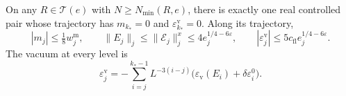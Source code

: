 \begin{theorem}\label{thm:rgfl-terminal-zero-pair}
On any $R\in\mathcal T(e)$ with $N\ge N_{\min}(R,e)$,
there is exactly one real controlled pair whose
trajectory has $m_{k_*}=0$ and
$\varepsilon_{k_*}^{\mathrm v}=0$.
Along its trajectory,
\begin{equation}\label{eq:rgfl-tuned-bounds}
 |m_j|\le\tfrac18w_j^{\mathrm m},\qquad
 \|E_j\|_j\le\|\mathscr E_j\|_j^x
                                  \le4e_j^{1/4-6\varepsilon},\qquad
 |\varepsilon_j^{\mathrm v}|
                          \le5c_{\mathrm{fl}}e_j^{1/4-6\varepsilon}.
\end{equation}
The vacuum at every level is
\begin{equation}\label{eq:rgfl-backward-vacuum}
 \varepsilon_j^{\mathrm v}
     =-\sum_{i=j}^{k_*-1}L^{-3(i-j)}
                      \big(\varepsilon_{\mathrm v}(E_i)
                                              +\delta\varepsilon_i^0\big).
\end{equation}
\end{theorem}

